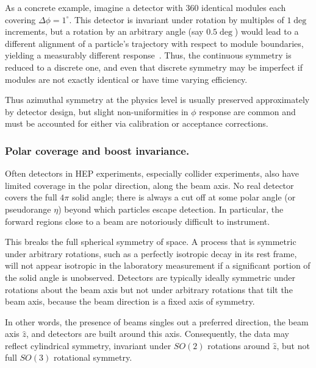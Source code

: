             As a concrete example, imagine a detector with 360 identical modules each covering $\Delta\phi = 1^\circ$.
            This detector is invariant under rotation by multiples of \(1\deg\) increments, but a rotation by an arbitrary angle (say $0.5\deg$) would lead to a different alignment of a particle's trajectory with respect to module boundaries, yielding a measurably different response~\cite{Nabat:2024nce}.
            Thus, the continuous symmetry is reduced to a discrete one, and even that discrete symmetry may be imperfect if modules are not exactly identical or have time varying efficiency.
            
            Thus azimuthal symmetry at the physics level is usually preserved approximately by detector design, but slight non-uniformities in $\phi$ response are common and must be accounted for either via calibration or acceptance corrections.

        \subsubsection{Polar coverage and boost invariance.}
            Often detectors in HEP experiments, especially collider experiments, also have limited coverage in the polar direction, along the beam axis.
            No real detector covers the full $4\pi$ solid angle;
            there is always a cut off at some polar angle (or pseudorange $\eta$) beyond which particles escape detection.
            In particular, the forward regions close to a beam are notoriously difficult to instrument.
            
            This breaks the full spherical symmetry of space.
            A process that is symmetric under arbitrary rotations, such as a perfectly isotropic decay in its rest frame, will not appear isotropic in the laboratory measurement if a significant portion of the solid angle is unobserved.
            Detectors are typically ideally symmetric under rotations about the beam axis but not under arbitrary rotations that tilt the beam axis, because the beam direction is a fixed axis of symmetry.
            
            In other words, the presence of beams singles out a preferred direction, the beam axis $\hat{z}$, and detectors are built around this axis. Consequently, the data may reflect cylindrical symmetry, invariant under \(SO(2)\) rotations around $\hat{z}$, but not full $SO(3)$ rotational symmetry.
            

